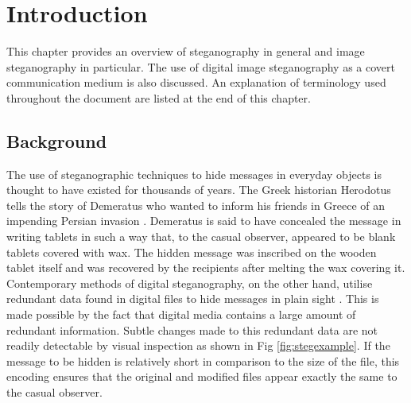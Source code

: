 \chapter{Introduction}
\label{ch:intro}
This chapter provides an overview of steganography in general and image steganography in particular. The use of digital image steganography as a covert communication medium is also discussed. An explanation of terminology used throughout the document are listed at the end of this chapter. 
\section{Background}
The use of steganographic techniques to hide messages in everyday objects is thought to have existed for thousands of years. The Greek historian Herodotus tells the story of Demeratus who wanted to inform his friends in Greece of an impending Persian invasion  \cite{kahn1996history}. Demeratus is said to have concealed the message in writing tablets in such a way that, to the casual observer, appeared to be blank tablets covered with wax. The hidden message was inscribed on the wooden tablet itself and was recovered by the recipients after melting the wax covering it.
Contemporary methods of digital steganography, on the other hand, utilise redundant data found in digital files to hide messages in plain sight  \cite{hinson2009introduction}.  This is made possible by the fact that digital media contains a large amount of redundant information. Subtle changes made to this redundant data are not readily detectable by visual inspection as shown in Fig \ref{fig:stegexample}.  If the message to be hidden is relatively short in comparison to the size of the file, this encoding ensures that the original and modified files appear exactly the same to the casual observer.
